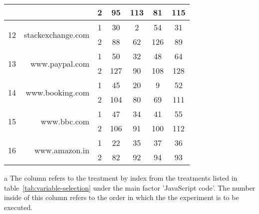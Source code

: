\begin{table}[ht]
\begin{threeparttable}
\begin{tabular}{cr|c|cccc}
 &&2 &  95 & 113 & 81 & 115 \\
\midrule
 \multirow{2}{*}{12} &    \multirow{2}{*}{stackexchange.com} &       1 &  30 & 2 & 54 & 31 \\
 &&2 &  88 & 62 & 126 & 89 \\
\midrule
 \multirow{2}{*}{13} &       \multirow{2}{*}{www.paypal.com} &       1 &  50 & 32 & 48 & 64 \\
 &&2 &  127 & 90 & 108 & 128 \\
\midrule
 \multirow{2}{*}{14} &      \multirow{2}{*}{www.booking.com} &       1 &  45 & 20 & 9 & 52 \\
 &&2 &  104 & 80 & 69 & 111 \\
\midrule
 \multirow{2}{*}{15} &          \multirow{2}{*}{www.bbc.com} &       1 &  47 & 34 & 41 & 55 \\
 &&2 &  106 & 91 & 100 & 112 \\
\midrule
 \multirow{2}{*}{16} &        \multirow{2}{*}{www.amazon.in} &       1 &  22 & 35 & 37 & 36 \\
 &&2 &  82 & 92 & 94 & 93 \\
\bottomrule
\end{tabular}
\begin{tablenotes}
    \item[a] The column refers to the treatment by index from the treatments listed in table~\ref{tab:variable-selection} under the main factor 'JavaScript code'. The number inside of this column refers to the order in which the the experiment is to be executed.
\end{tablenotes}
\end{threeparttable}

\label{tab:execution:experiment-design}
\end{table}